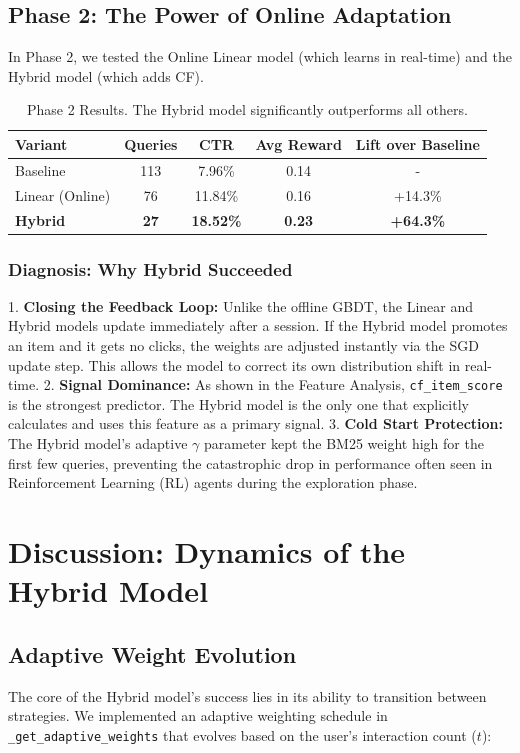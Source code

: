 \documentclass[11pt,a4paper]{article}
\begin{document}
\subsection{Phase 2: The Power of Online Adaptation}
In Phase 2, we tested the Online Linear model (which learns in real-time) and the Hybrid model (which adds CF).

\begin{table}[H]
\centering
\begin{tabular}{@{}lcccc@{}}
\toprule
\textbf{Variant} & \textbf{Queries} & \textbf{CTR} & \textbf{Avg Reward} & \textbf{Lift over Baseline} \\ \midrule
Baseline & 113 & 7.96\% & 0.14 & - \\
Linear (Online) & 76 & 11.84\% & 0.16 & +14.3\% \\
\textbf{Hybrid} & \textbf{27} & \textbf{18.52\%} & \textbf{0.23} & \textbf{+64.3\%} \\ \bottomrule
\end{tabular}
\caption{Phase 2 Results. The Hybrid model significantly outperforms all others.}
\end{table}

\subsubsection{Diagnosis: Why Hybrid Succeeded}
1.  \textbf{Closing the Feedback Loop:} Unlike the offline GBDT, the Linear and Hybrid models update immediately after a session. If the Hybrid model promotes an item and it gets no clicks, the weights are adjusted instantly via the SGD update step. This allows the model to correct its own distribution shift in real-time.
2.  \textbf{Signal Dominance:} As shown in the Feature Analysis, \texttt{cf\_item\_score} is the strongest predictor. The Hybrid model is the only one that explicitly calculates and uses this feature as a primary signal.
3.  \textbf{Cold Start Protection:} The Hybrid model's adaptive $\gamma$ parameter kept the BM25 weight high for the first few queries, preventing the catastrophic drop in performance often seen in Reinforcement Learning (RL) agents during the exploration phase.

\section{Discussion: Dynamics of the Hybrid Model}

\subsection{Adaptive Weight Evolution}
The core of the Hybrid model's success lies in its ability to transition between strategies. We implemented an adaptive weighting schedule in \texttt{\_get\_adaptive\_weights} that evolves based on the user's interaction count ($t$):
\end{document}
